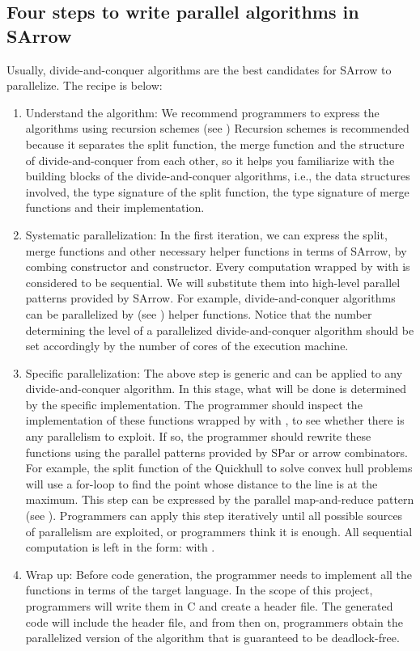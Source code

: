 \subsection{Four steps to write parallel algorithms in SArrow}
Usually, divide-and-conquer algorithms are the best candidates for SArrow to parallelize. The recipe is below:
\begin{enumerate}
    \item Understand the algorithm: We recommend programmers to express the algorithms using recursion schemes (see ) Recursion schemes is recommended because it separates the split function, the merge function and the structure of divide-and-conquer from each other, so it helps you familiarize with the building blocks of the divide-and-conquer algorithms, i.e., the data structures involved, the type signature of the split function, the type signature of merge functions and their implementation.
    \item Systematic parallelization: In the first iteration, we can express the split, merge functions and other necessary helper functions in terms of SArrow, by combing  constructor and  constructor. Every computation wrapped by  with  is considered to be sequential. We will substitute them into high-level parallel patterns provided by SArrow. For example, divide-and-conquer algorithms can be parallelized by  (see ) helper functions. Notice that the number determining the level of a parallelized divide-and-conquer algorithm should be set accordingly by the number of cores of the execution machine.
    \item Specific parallelization: The above step is generic and can be applied to any divide-and-conquer algorithm. In this stage, what will be done is determined by the specific implementation. The programmer should inspect the implementation of these functions wrapped by  with , to see whether there is any parallelism to exploit. If so, the programmer should rewrite these functions using the parallel patterns provided by SPar or arrow combinators. For example, the split function of the Quickhull \cite{barberQuickhullAlgorithmConvex1996} to solve convex hull problems will use a for-loop to find the point whose distance to the line is at the maximum. This step can be expressed by the parallel map-and-reduce pattern (see ). Programmers can apply this step iteratively until all possible sources of parallelism are exploited, or programmers think it is enough. All sequential computation is left in the form:  with .
    \item Wrap up: Before code generation, the programmer needs to implement all the  functions in terms of the target language. In the scope of this project, programmers will write them in C and create a header file. The generated code will include the header file, and from then on, programmers obtain the parallelized version of the algorithm that is guaranteed to be deadlock-free.
\end{enumerate}
